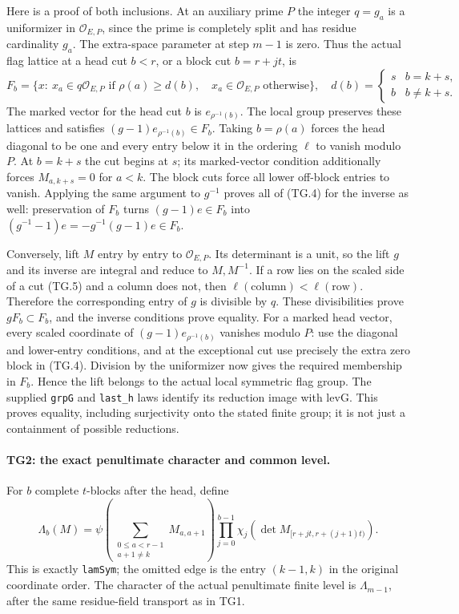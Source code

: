 \documentclass[11pt,a4paper]{article}
\numberwithin{equation}{section}
\theoremstyle{remark}\newtheorem{remark}[theorem]{Remark}
\begin{document}
Here is a proof of both inclusions. At an auxiliary prime $P$ the
integer $q=g_a$ is a uniformizer in $\mathcal O_{E,P}$, since the
prime is completely split and has residue cardinality $g_a$.
The extra-space parameter at step $m-1$ is zero. Thus the actual
flag lattice at a head cut $b<r$, or a block cut $b=r+jt$, is
\[
 F_b=\{x:\ x_a\in q\mathcal O_{E,P}
                \text{ if }\rho(a)\ge d(b),\quad
                x_a\in\mathcal O_{E,P}\text{ otherwise}\},
 \quad d(b)=\begin{cases}s&b=k+s,\\b&b\ne k+s.\end{cases}
 \tag{TG.5}
\]
The marked vector for the head cut $b$ is $e_{\rho^{-1}(b)}$.
The local group preserves these lattices and satisfies
$(g-1)e_{\rho^{-1}(b)}\in F_b$. Taking $b=\rho(a)$ forces the
head diagonal to be one and every entry below it in the ordering
$\ell$ to vanish modulo $P$. At $b=k+s$ the cut begins at $s$;
its marked-vector condition additionally forces
$M_{a,k+s}=0$ for $a<k$. The block cuts force all lower off-block
entries to vanish. Applying the same argument to $g^{-1}$ proves
all of (TG.4) for the inverse as well: preservation of $F_b$ turns
$(g-1)e\in F_b$ into $(g^{-1}-1)e=-g^{-1}(g-1)e\in F_b$.

Conversely, lift $M$ entry by entry to $\mathcal O_{E,P}$.
Its determinant is a unit, so the lift $g$ and its inverse are
integral and reduce to $M,M^{-1}$. If a row lies on the scaled
side of a cut (TG.5) and a column does not, then
$\ell(\text{column})<\ell(\text{row})$. Therefore the corresponding
entry of $g$ is divisible by $q$. These divisibilities prove
$gF_b\subset F_b$, and the inverse conditions prove equality.
For a marked head vector, every scaled coordinate of
$(g-1)e_{\rho^{-1}(b)}$ vanishes modulo $P$: use the diagonal and
lower-entry conditions, and at the exceptional cut use precisely
the extra zero block in (TG.4). Division by the uniformizer now
gives the required membership in $F_b$. Hence the lift belongs
to the actual local symmetric flag group. The supplied
\texttt{grpG} and \texttt{last\_\allowbreak h} laws identify its reduction
image with $\mathrm{levG}$. This proves equality, including
surjectivity onto the stated finite group; it is not just a
containment of possible reductions.

\paragraph{TG2: the exact penultimate character and common level.}
For $b$ complete $t$-blocks after the head, define
\[
 \Lambda_b(M)=
 \psi\!\left(\sum_{\substack{0\le a<r-1\\a+1\ne k}}
                     M_{a,a+1}\right)
 \prod_{j=0}^{b-1}\chi_j\!\left(
       \det M_{[r+jt,r+(j+1)t)}\right).
 \tag{TG.6}
\]
This is exactly \texttt{lamSym}; the omitted edge is the entry
$(k-1,k)$ in the original coordinate order. The character of the
actual penultimate finite level is $\Lambda_{m-1}$, after the
same residue-field transport as in TG1.
\end{document}
